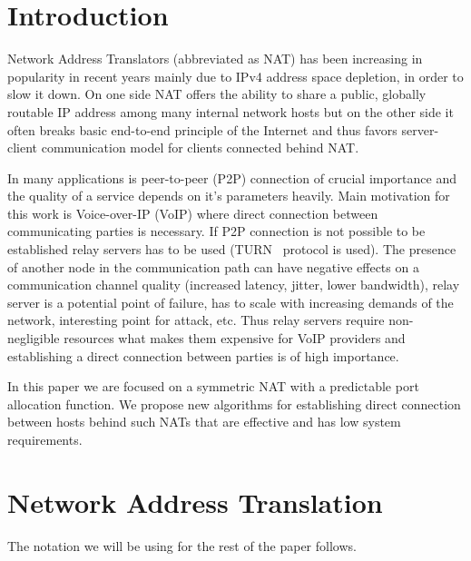 \documentclass[twoside]{article}
\begin{document}
\begin{multicols}{2}

\section{Introduction}
Network Address Translators (abbreviated as NAT) has been increasing in popularity in recent years 
mainly due to IPv4 address space depletion, in order to slow it down. On one side NAT offers
the ability to share a public, globally routable IP address among many internal network hosts but on 
the other side it often breaks basic end-to-end principle of the Internet and thus favors server-client 
communication model for clients connected behind NAT.

In many applications is peer-to-peer (P2P) connection of crucial importance and the quality of a service depends on 
it's parameters heavily. Main motivation for this work is Voice-over-IP (VoIP) where direct connection 
between communicating parties is necessary. If P2P connection is not possible to be established relay 
servers has to be used (TURN~\citep{rfc5766} protocol is used). The presence 
of another node in the communication path can have negative effects on a communication channel quality 
(increased latency, jitter, lower bandwidth), relay server is a potential point of failure, 
has to scale with increasing demands of the network, interesting point for attack, etc.
Thus relay servers require non-negligible resources what makes them expensive for VoIP providers and
establishing a direct connection between parties is of high importance.

In this paper we are focused on a symmetric NAT with a predictable port allocation function. We propose 
new algorithms for establishing direct connection between hosts behind such NATs that are effective and 
has low system requirements.

\section{Network Address Translation}
The notation we will be using for the rest of the paper follows.



\end{multicols}
\end{document}
